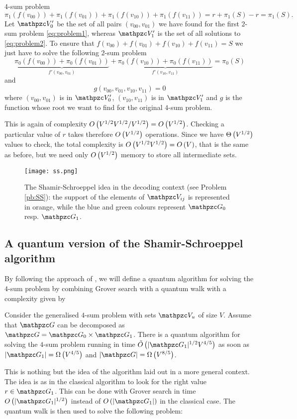 $4$-sum problem
$$
\pi_1( f(v_{00}))+\pi_1(f(v_{01})) +\pi_1(f(v_{10}))+\pi_1(f(v_{11}))  = r + \pi_1(S)-r = \pi_1(S).
$$
Let $\zV'_0$ be the set of all pairs $(v_{00},v_{01})$ we have found for the 
first $2$-sum problem \eqref{eq:problem1}, whereas $\zV'_1$ is the set of all solutions to \eqref{eq:problem2}. 
To ensure that $f(v_{00})+f(v_{01}) +f(v_{10})+f(v_{11}) =  S$ 
we just have to 
solve the following $2$-sum problem
$$
\underbrace{\pi_0(f(v_{00})) + \pi_0(f(v_{01}) )}_{f'(v_{00},v_{01})}+ \underbrace{\pi_0(f(v_{10})) + \pi_0(f(v_{11}) )}_{f'(v_{10},v_{11})} = \pi_0(S)
$$
and $$
g(v_{00},v_{01},v_{10},v_{11})=0
$$
where $(v_{00},v_{01})$ is in $\zV'_0$, $(v_{10},v_{11})$ is in $\zV'_1$ and 
$g$ is the function whose root we want to find for the original $4$-sum problem.

This is again of complexity $O\left( V^{1/2} V^{1/2}/V^{1/2} \right)=O\left( V^{1/2} \right) $.
Checking a particular value of $r$ takes therefore $O\left( V^{1/2} \right)$
 operations. Since we have $\Theta\left( V^{1/2} \right)$ values to check, the 
total complexity is $O\left( V^{1/2}V^{1/2} \right)=O\left( V \right)$, that is the same as before, but we need only $O\left( V^{1/2} \right)$ memory to store all intermediate sets.
\begin{figure}[h]
    \centering
    \texttt{[image: ss.png]}
    \caption{
The Shamir-Schroeppel idea in the decoding context (see Problem \ref{pb:SS}): the support of the elements of $\zV_{ij}$ is represented in orange, while
the blue and green colours represent $\zG_0$ resp. $\zG_1$.}
    \label{fig:ss}
\end{figure}
\subsection{A quantum version of the Shamir-Schroeppel algorithm}

By following the approach of \cite{BJLM13}, we will define a quantum
algorithm for  
solving the $4$-sum problem
by combining Grover search with a quantum walk
with a complexity given by

\begin{proposition}\label{prop:easy}
Consider the generalised $4$-sum problem  with sets $\zV_u$ of size  $V$. Assume that 
$\zG$ can be decomposed as $\zG =\zG_0 \times \zG_1$. 
There is a quantum algorithm for solving the $4$-sum problem running in time $\OOt{|\zG_1|^{1/2}V^{4/5}}$
as soon as $|\zG_1| = \Om{V^{4/5}}$ and $|\zG| = \Om{V^{8/5}}$.
\end{proposition}

This is nothing but the idea of the algorithm \cite[Sec. 4]{BJLM13} laid out in a more general context.
The idea is as in the classical algorithm to look for the right value $r \in \zG_1$. This can be done with Grover search in 
time $\OO{|\zG_1|^{1/2}}$ instead of $\OO{|\zG_1|}$ in the classical case.
The quantum walk is then used to solve the following problem:

